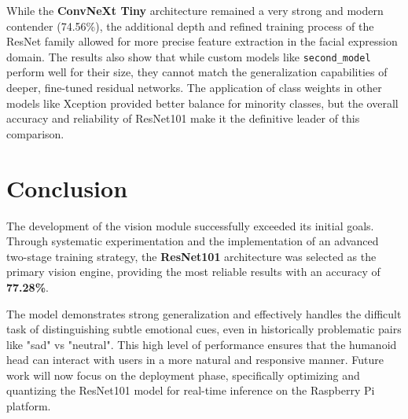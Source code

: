 \documentclass{article}
\begin{document}
While the \textbf{ConvNeXt Tiny} architecture remained a very strong and modern contender (74.56\%), the additional depth and refined training process of the ResNet family allowed for more precise feature extraction in the facial expression domain. The results also show that while custom models like \texttt{second\_model} perform well for their size, they cannot match the generalization capabilities of deeper, fine-tuned residual networks. The application of class weights in other models like Xception provided better balance for minority classes, but the overall accuracy and reliability of ResNet101 make it the definitive leader of this comparison.

\section{Conclusion}
The development of the vision module successfully exceeded its initial goals. Through systematic experimentation and the implementation of an advanced two-stage training strategy, the \textbf{ResNet101} architecture was selected as the primary vision engine, providing the most reliable results with an accuracy of \textbf{77.28\%}. 

The model demonstrates strong generalization and effectively handles the difficult task of distinguishing subtle emotional cues, even in historically problematic pairs like "sad" vs "neutral". This high level of performance ensures that the humanoid head can interact with users in a more natural and responsive manner. Future work will now focus on the deployment phase, specifically optimizing and quantizing the ResNet101 model for real-time inference on the Raspberry Pi platform.
\end{document}
